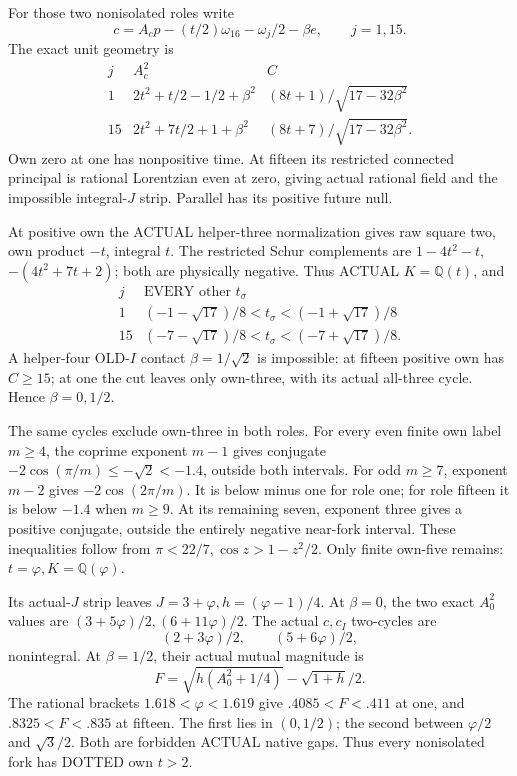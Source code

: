 For those two nonisolated roles write
\[
       c=A_cp-(t/2)\omega_{16}-\omega_j/2-\beta e,\qquad j=1,15 .
\]
The exact unit geometry is
\[
\begin{array}{c|c|c}
 j&A_c^2&C\\ \hline
 1&2t^2+t/2-1/2+\beta^2&(8t+1)/\sqrt{17-32\beta^2}\\
 15&2t^2+7t/2+1+\beta^2&(8t+7)/\sqrt{17-32\beta^2}.
\end{array}
\]
Own zero at one has nonpositive time.
At fifteen its restricted connected
principal is rational Lorentzian even
at zero, giving actual rational field
and the impossible integral-\(J\) strip.
Parallel has its positive future null.

At positive own the ACTUAL helper-three
normalization gives raw square two,
own product \(-t\), integral \(t\).
The restricted Schur complements are
\(1-4t^2-t\), \(-(4t^2+7t+2)\);
both are physically negative.
Thus ACTUAL \(K=\mathbb Q(t)\), and
\[
\begin{array}{c|c}
 j&\text{EVERY other }t_\sigma\\ \hline
 1&(-1-\sqrt{17})/8<t_\sigma<(-1+\sqrt{17})/8\\
 15&(-7-\sqrt{17})/8<t_\sigma<(-7+\sqrt{17})/8 .
\end{array}
\tag{D16Itstrip}\label{eq:arithD16Inonisolatedstrip}
\]
A helper-four OLD-\(I\) contact
\(\beta=1/\sqrt2\) is impossible:
at fifteen positive own has \(C\ge15\);
at one the cut leaves only own-three,
with its actual all-three cycle.
Hence \(\beta=0,1/2\).

The same cycles exclude own-three
in both roles.
For every even finite own label
\(m\ge4\), the coprime exponent
\(m-1\) gives conjugate
\(-2\cos(\pi/m)\le-\sqrt2<-1.4\),
outside both intervals.
For odd \(m\ge7\), exponent \(m-2\)
gives \(-2\cos(2\pi/m)\).
It is below minus one for role one;
for role fifteen it is below \(-1.4\)
when \(m\ge9\).
At its remaining seven, exponent three
gives a positive conjugate, outside
the entirely negative near-fork interval.
These inequalities follow from
\(\pi<22/7,\cos z>1-z^2/2\).
Only finite own-five remains:
\(t=\varphi,K=\mathbb Q(\varphi)\).

Its actual-\(J\) strip leaves
\(J=3+\varphi,h=(\varphi-1)/4\).
At \(\beta=0\), the two exact
\(A_0^2\) values are
\((3+5\varphi)/2,(6+11\varphi)/2\).
The actual \(c,c_I\) two-cycles are
\[
                          (2+3\varphi)/2,\qquad(5+6\varphi)/2 ,
\]
nonintegral.
At \(\beta=1/2\), their actual mutual
magnitude is
\[
                     F=\sqrt{h(A_0^2+1/4)}
                                     -\sqrt{1+h}/2 .
\]
The rational brackets
\(1.618<\varphi<1.619\) give
\(.4085<F<.411\) at one, and
\(.8325<F<.835\) at fifteen.
The first lies in \((0,1/2)\);
the second between \(\varphi/2\)
and \(\sqrt3/2\).
Both are forbidden ACTUAL native gaps.
Thus every nonisolated fork has
DOTTED own \(t>2\).

